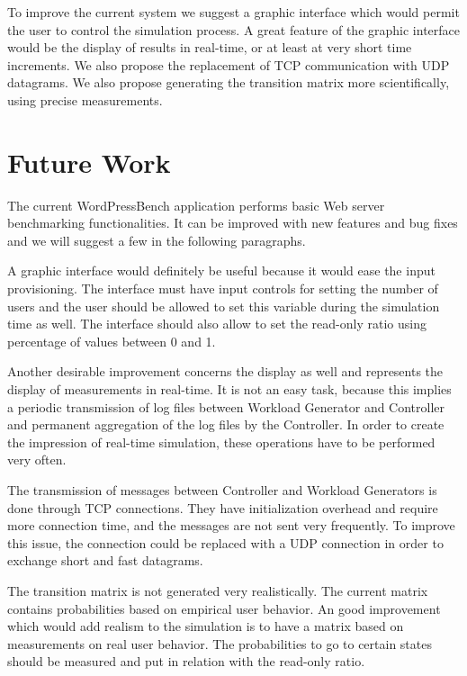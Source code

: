 To improve the current system we suggest a graphic interface which would permit the user to control the simulation process. A great feature of the graphic interface would be the display of results in real-time, or at least at very short time increments. We also propose the replacement of TCP communication with UDP datagrams. We also propose generating the transition matrix more scientifically, using precise measurements.


\section{Future Work}
\label{sec:future-work}

The current WordPressBench application performs basic Web server benchmarking functionalities. It can be improved with new features and bug fixes and we will suggest a few in the following paragraphs.

A graphic interface would definitely be useful because it would ease the input provisioning. The interface must have input controls for setting the number of users and the user should be allowed to set this variable during the simulation time as well. The interface should also allow to set the read-only ratio using percentage of values between 0 and 1.

Another desirable improvement concerns the display as well and represents the display of measurements in real-time. It is not an easy task, because this implies a periodic transmission of log files between Workload Generator and Controller and permanent aggregation of the log files by the Controller. In order to create the impression of real-time simulation, these operations have to be performed very often.

The transmission of messages between Controller and Workload Generators is done through TCP connections. They have initialization overhead and require more connection time, and the messages are not sent very frequently. To improve this issue, the connection could be replaced with a UDP connection in order to exchange short and fast datagrams.

The transition matrix is not generated very realistically. The current matrix contains probabilities based on empirical user behavior. An good improvement which would add realism to the simulation is to have a matrix based on measurements on real user behavior. The probabilities to go to certain states should be measured and put in relation with the read-only ratio.

